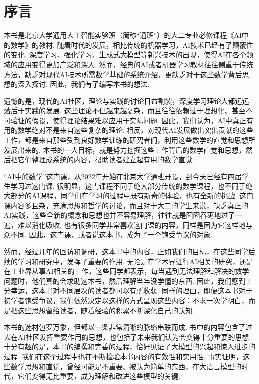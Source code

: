 \chapter*{序言}

本书是北京大学通用人工智能实验班（简称“通班”）的大二专业必修课程《AI中的数学》的教材. 随着时代的发展，相比传统的机器学习，AI技术已经有了颠覆性的变化. 深度学习、强化学习、生成式大模型等新兴技术的出现，使得AI在各个领域的应用变得更加广泛和深入. 然而，经典的AI或者机器学习教材往往侧重于传统方法，缺乏对现代AI技术所需数学基础的系统介绍，更缺乏对于这些数学背后思想的深入探讨. 因此，我们有了编写本书的想法. 

遗憾的是，现代的AI社区，理论与实践的讨论日益割裂，深度学习理论大都远远落后于实践的发展. 这些理论不但越来越复杂，而且往往依赖过于理想化、甚至不可验证的假设，使得理论结果难以应用于实际问题. 因此，我们认为，AI中真正有用的数学绝对不是来自这些复杂的理论. 相反，对现代AI发展做出突出贡献的这些工作，都是来自那些受到良好数学训练的研究者们，利用这些数学的直觉和思想所发展出来的. 本书的一大目标，就是努力挖掘这些工作背后的数学直觉和思想，然后把它们整理成系统的内容，帮助读者建立起有用的数学直觉. 

“AI中的数学”这门课，从2022年开始在北京大学通班开设，到今天已经有四届学生学习过这门课. 很明显，这门课程不同于绝大部分传统的数学课程，也不同于绝大部分的AI课程，同学们在学习的过程中既有新奇的体验，也有全新的挑战. 这门课内容多且杂，充满思想和哲学的讨论，而且对于大二的学生来说，缺乏真正的AI实践，这些全新的概念和思想也并不容易理解，往往就是囫囵吞枣地过了一遍，难以消化吸收. 也有很多同学非常喜欢这门课的内容，同样是因为它这样地与众不同. 因此，这门课，或者说这本书，成为了一个饱受争议的对象. 

然而，经过几年的回访和调研，这本书中的内容，正如我们的目标，在这些同学后续的学习和研究中，发挥了重要的作用. 无论是在学术界进行AI相关的研究，还是在工业界从事AI相关的工作，这些同学都表示，每当遇到无法理解和解决的数学问题时，他们真的会求助这本书，然后理解当年没学懂的东西. 因此，我们感到十分幸运，这本书对不同层次的读者都可以有所收获. 同样的理由，即便这本书对于初学者饱受争议，我们依然决定以这样的方式呈现这些内容：不求一次学明白，而是把这些思想留给读者，随着经验的积累不断深化自己的认知. 

本书的选材包罗万象，但都以一条非常清晰的脉络串联而成. 书中的内容包含了过去在AI社区发挥重要作用的思想，也包括了未来我们认为会变得十分重要的思想. 十分有趣的是，本书的编撰和完善的过程，恰好见证了大模型的兴起和惊人进步的过程. 我们在这个过程中也在不断检验本书内容的有效性和实用性. 事实证明，这些数学思想和直觉，曾经可能是不重要、被认为简单的东西，在大语言模型的时代，它们变得无比重要，成为理解和改进这些模型的关键. 


